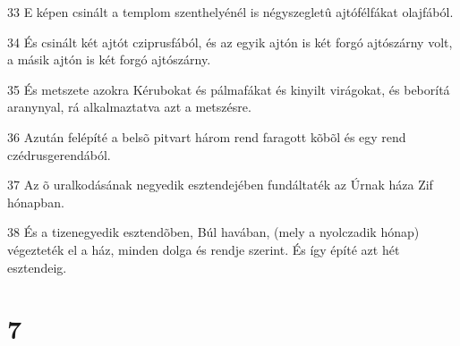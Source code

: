 \par 33 E képen csinált a templom szenthelyénél is négyszegletû ajtófélfákat olajfából.
\par 34 És csinált két ajtót cziprusfából, és az egyik ajtón is két forgó ajtószárny volt, a másik ajtón is két forgó ajtószárny.
\par 35 És metszete azokra Kérubokat és pálmafákat és kinyilt virágokat, és beborítá aranynyal, rá alkalmaztatva azt a metszésre.
\par 36 Azután felépíté a belsõ pitvart három rend faragott kõbõl és egy rend czédrusgerendából.
\par 37 Az õ uralkodásának negyedik esztendejében fundáltaték az Úrnak háza Zif hónapban.
\par 38 És a tizenegyedik esztendõben, Búl havában, (mely a nyolczadik hónap) végezteték el a ház, minden dolga és rendje szerint. És így építé azt hét esztendeig.

\chapter{7}

